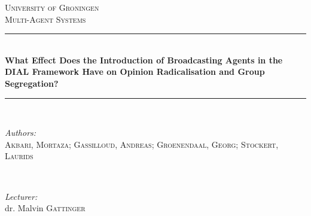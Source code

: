 \begin{titlepage}

\newcommand{\HRule}{\rule{\linewidth}{0.5mm}} %

\center %
 

\textsc{\LARGE University of Groningen}\\[1.5cm] %
\textsc{\Large Multi-Agent Systems}\\[0.5cm] %


\HRule \\[0.4cm]
{ \huge \bfseries What Effect Does the Introduction of Broadcasting Agents in the DIAL Framework Have on Opinion Radicalisation and Group Segregation?}\\[0.4cm] %
\HRule \\[1.5cm]
 

\begin{minipage}{0.4\textwidth}
\begin{flushleft} \large
\emph{Authors:}\\
\textsc{Akbari, Mortaza;  Gassilloud, Andreas; Groenendaal, Georg; Stockert, Laurids}

\end{flushleft}
\end{minipage}
~
\begin{minipage}{0.4\textwidth}
\begin{flushright} \large
\emph{Lecturer:} \\
dr. Malvin \textsc{Gattinger} \\
\end{flushright}
\end{minipage}\\[2cm]


\end{titlepage}
